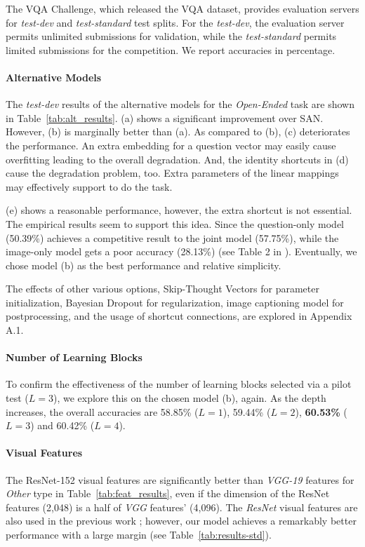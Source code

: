 \documentclass{article}
\begin{document}
The VQA Challenge, which released the VQA dataset, provides evaluation servers for \textit{test-dev} and \textit{test-standard} test splits. For the \textit{test-dev}, the evaluation server permits unlimited submissions for validation, while the \textit{test-standard} permits limited submissions for the competition. We report accuracies in percentage. 

\paragraph{Alternative Models} The \textit{test-dev} results of the alternative models for the \textit{Open-Ended} task are shown in Table~\ref{tab:alt_results}. (a) shows a significant improvement over SAN. However, (b) is marginally better than (a). As compared to (b), (c) deteriorates the performance. An extra embedding for a question vector may easily cause overfitting leading to the overall degradation. And, the identity shortcuts in (d) cause the degradation problem, too. Extra parameters of the linear mappings may effectively support to do the task. 

(e) shows a reasonable performance, however, the extra shortcut is not essential. The empirical results seem to support this idea. Since the question-only model (50.39\%) achieves a competitive result to the joint model (57.75\%), while the image-only model gets a poor accuracy (28.13\%) (see Table 2 in \cite{Antol2015}). Eventually, we chose model (b) as the best performance and relative simplicity.

The effects of other various options, Skip-Thought Vectors \cite{Kiros2015} for parameter initialization, Bayesian Dropout \cite{Gal2015} for regularization, image captioning model \cite{Karpathy} for postprocessing, and the usage of shortcut connections, are explored in Appendix A.1. 

\paragraph{Number of Learning Blocks} To confirm the effectiveness of the number of learning blocks selected via a pilot test ($L=3$), we explore this on the chosen model (b), again. As the depth increases, the overall accuracies are 58.85\% ($L=1$), 59.44\% ($L=2$), \textbf{60.53\%} ($L=3$) and 60.42\% ($L=4$).

\paragraph{Visual Features} The ResNet-152 visual features are significantly better than \textit{VGG-19} features for \textit{Other} type in Table~\ref{tab:feat_results}, even if the dimension of the ResNet features (2,048) is a half of \textit{VGG} features' (4,096). The \textit{ResNet} visual features are also used in the previous work \cite{Ilievski2016}; however, our model achieves a remarkably better performance with a large margin (see Table~\ref{tab:results-std}).
\end{document}

